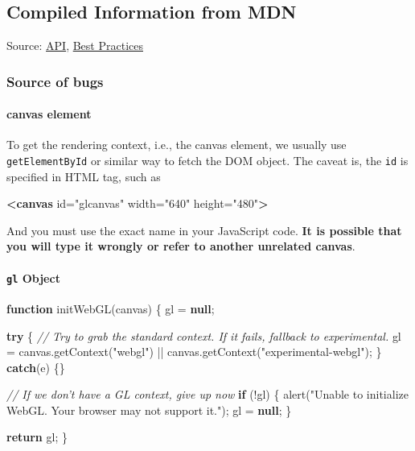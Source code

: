 \documentclass[]{article}
\newenvironment{Shaded}{}{}
\newcommand{\KeywordTok}[1]{\textcolor[rgb]{0.00,0.44,0.13}{\textbf{{#1}}}}
\newcommand{\StringTok}[1]{\textcolor[rgb]{0.25,0.44,0.63}{{#1}}}
\newcommand{\CommentTok}[1]{\textcolor[rgb]{0.38,0.63,0.69}{\textit{{#1}}}}
\newcommand{\OtherTok}[1]{\textcolor[rgb]{0.00,0.44,0.13}{{#1}}}
\newcommand{\FunctionTok}[1]{\textcolor[rgb]{0.02,0.16,0.49}{{#1}}}
\newcommand{\NormalTok}[1]{{#1}}
\begin{document}
\subsection{Compiled Information from
MDN}\label{compiled-information-from-mdn}

Source: \href{https://developer.mozilla.org/en-US/docs/Web/API}{API},
\href{https://developer.mozilla.org/en-US/docs/Web/API/WebGL_API/WebGL_best_practices}{Best
Practices}

\subsubsection{Source of bugs}\label{source-of-bugs}

\paragraph{canvas element}\label{canvas-element}

To get the rendering context, i.e., the canvas element, we usually use
\texttt{getElementById} or similar way to fetch the DOM object. The
caveat is, the \texttt{id} is specified in HTML tag, such as

\begin{Shaded}
\begin{Highlighting}[]
\KeywordTok{<canvas}\OtherTok{ id=}\StringTok{"glcanvas"}\OtherTok{ width=}\StringTok{"640"}\OtherTok{ height=}\StringTok{"480"}\KeywordTok{>}
\end{Highlighting}
\end{Shaded}

And you must use the exact name in your JavaScript code. \textbf{It is
possible that you will type it wrongly or refer to another unrelated
canvas}.

\paragraph{\texttt{gl} Object}\label{gl-object}

\begin{Shaded}
\begin{Highlighting}[]
\KeywordTok{function} \FunctionTok{initWebGL}\NormalTok{(canvas) \{}
  \NormalTok{gl = }\KeywordTok{null}\NormalTok{;}

  \KeywordTok{try} \NormalTok{\{}
    \CommentTok{// Try to grab the standard context. If it fails, fallback to experimental.}
    \NormalTok{gl = }\OtherTok{canvas}\NormalTok{.}\FunctionTok{getContext}\NormalTok{(}\StringTok{"webgl"}\NormalTok{) || }\OtherTok{canvas}\NormalTok{.}\FunctionTok{getContext}\NormalTok{(}\StringTok{"experimental-webgl"}\NormalTok{);}
  \NormalTok{\}}
  \KeywordTok{catch}\NormalTok{(e) \{\}}

  \CommentTok{// If we don't have a GL context, give up now}
  \KeywordTok{if} \NormalTok{(!gl) \{}
    \FunctionTok{alert}\NormalTok{(}\StringTok{"Unable to initialize WebGL. Your browser may not support it."}\NormalTok{);}
    \NormalTok{gl = }\KeywordTok{null}\NormalTok{;}
  \NormalTok{\}}

  \KeywordTok{return} \NormalTok{gl;}
\NormalTok{\}}
\end{Highlighting}
\end{Shaded}
\end{document}
